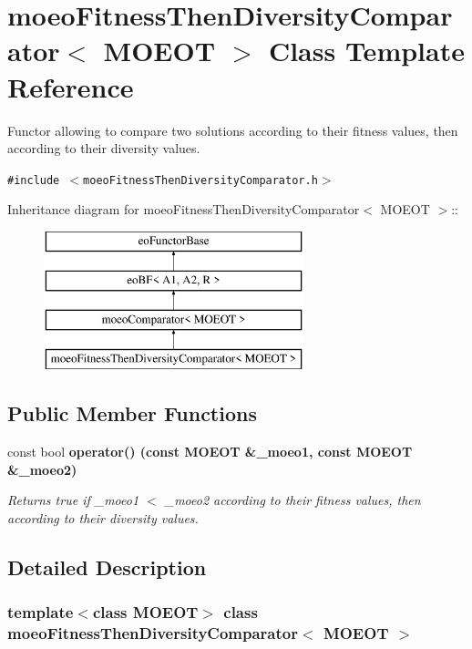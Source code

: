 \section{moeo\-Fitness\-Then\-Diversity\-Comparator$<$ MOEOT $>$ Class Template Reference}
\label{classmoeoFitnessThenDiversityComparator}
Functor allowing to compare two solutions according to their fitness values, then according to their diversity values.  


{\tt \#include $<$moeo\-Fitness\-Then\-Diversity\-Comparator.h$>$}

Inheritance diagram for moeo\-Fitness\-Then\-Diversity\-Comparator$<$ MOEOT $>$::\begin{figure}[H]
\begin{center}
\leavevmode
\includegraphics[height=4cm]{classmoeoFitnessThenDiversityComparator}
\end{center}
\end{figure}
\subsection*{Public Member Functions}
\begin{CompactItemize}
\item 
const bool \bf{operator()} (const MOEOT \&\_\-moeo1, const MOEOT \&\_\-moeo2)
\begin{CompactList}\small\item\em Returns true if \_\-moeo1 $<$ \_\-moeo2 according to their fitness values, then according to their diversity values. \item\end{CompactList}\end{CompactItemize}


\subsection{Detailed Description}
\subsubsection*{template$<$class MOEOT$>$ class moeo\-Fitness\-Then\-Diversity\-Comparator$<$ MOEOT $>$}

